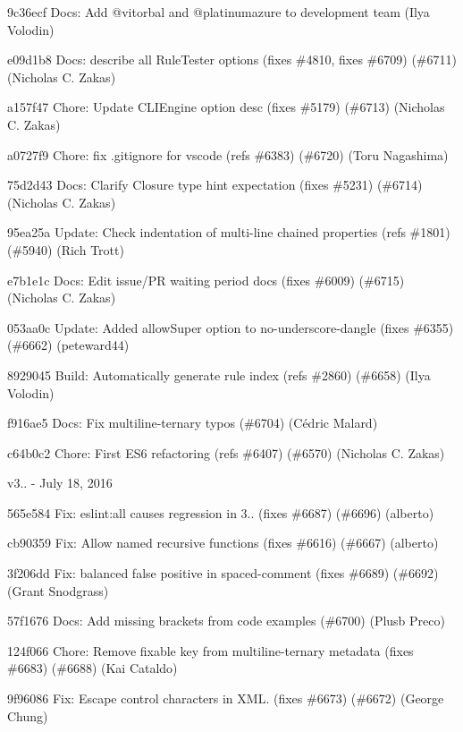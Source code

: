 \begin{DoxyItemize}
\item 9c36ecf Docs\+: Add @vitorbal and @platinumazure to development team (Ilya Volodin)
\item e09d1b8 Docs\+: describe all Rule\+Tester options (fixes \#4810, fixes \#6709) (\#6711) (Nicholas C. Zakas)
\item a157f47 Chore\+: Update C\+L\+I\+Engine option desc (fixes \#5179) (\#6713) (Nicholas C. Zakas)
\item a0727f9 Chore\+: fix {\ttfamily .gitignore} for vscode (refs \#6383) (\#6720) (Toru Nagashima)
\item 75d2d43 Docs\+: Clarify Closure type hint expectation (fixes \#5231) (\#6714) (Nicholas C. Zakas)
\item 95ea25a Update\+: Check indentation of multi-\/line chained properties (refs \#1801) (\#5940) (Rich Trott)
\item e7b1e1c Docs\+: Edit issue/\+PR waiting period docs (fixes \#6009) (\#6715) (Nicholas C. Zakas)
\item 053aa0c Update\+: Added \textquotesingle{}allow\+Super\textquotesingle{} option to {\ttfamily no-\/underscore-\/dangle} (fixes \#6355) (\#6662) (peteward44)
\item 8929045 Build\+: Automatically generate rule index (refs \#2860) (\#6658) (Ilya Volodin)
\item f916ae5 Docs\+: Fix multiline-\/ternary typos (\#6704) (Cédric Malard)
\item c64b0c2 Chore\+: First E\+S6 refactoring (refs \#6407) (\#6570) (Nicholas C. Zakas)
\end{DoxyItemize}

v3.. -\/ July 18, 2016


\begin{DoxyItemize}
\item 565e584 Fix\+: {\ttfamily eslint\+:all} causes regression in 3.. (fixes \#6687) (\#6696) (alberto)
\item cb90359 Fix\+: Allow named recursive functions (fixes \#6616) (\#6667) (alberto)
\item 3f206dd Fix\+: {\ttfamily balanced} false positive in {\ttfamily spaced-\/comment} (fixes \#6689) (\#6692) (Grant Snodgrass)
\item 57f1676 Docs\+: Add missing brackets from code examples (\#6700) (Plusb Preco)
\item 124f066 Chore\+: Remove fixable key from multiline-\/ternary metadata (fixes \#6683) (\#6688) (Kai Cataldo)
\item 9f96086 Fix\+: Escape control characters in X\+ML. (fixes \#6673) (\#6672) (George Chung)
\end{DoxyItemize}

